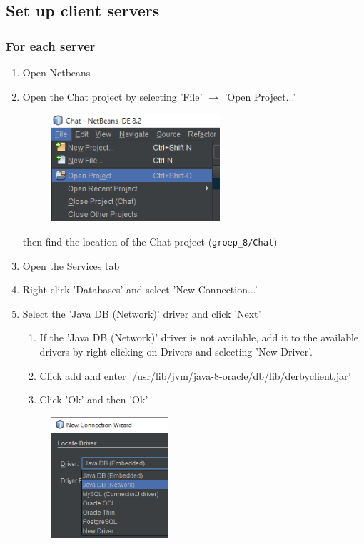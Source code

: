 \documentclass[11pt]{article}
\begin{document}
\subsection{Set up client servers}
\subsubsection{For each server}
\begin{enumerate}
	\item Open Netbeans
	\item Open the Chat project by selecting 'File' $\rightarrow$ 'Open Project...'
	\begin{figure}[H]
		\centering
		\includegraphics[height=40mm]{open_project.png}
	\end{figure}
	then find the location of the Chat project (\texttt{groep\_8/Chat})
	\item Open the Services tab
	\item Right click 'Databases' and select 'New Connection...'
	\item Select the 'Java DB (Network)' driver and click 'Next'
	\begin{enumerate}
		\item If the 'Java DB (Network)' driver is not available, add it to the available drivers by right clicking on Drivers and selecting 'New Driver'.
		\item Click add and enter '/usr/lib/jvm/java-8-oracle/db/lib/derbyclient.jar'
		\item Click 'Ok' and then 'Ok'
	\end{enumerate}
	\begin{figure}[H]
		\centering
		\includegraphics[height=45mm]{select_db_driver.png}

\end{figure}
\end{enumerate}
\end{document}
